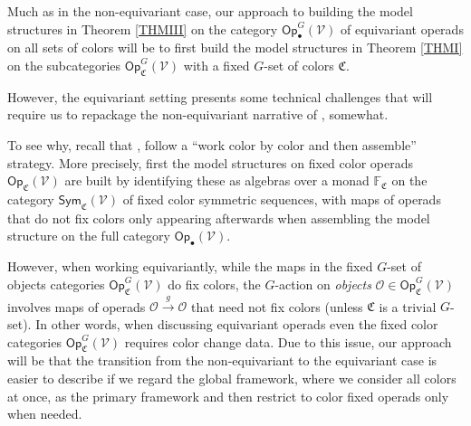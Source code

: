 \documentclass[a4paper,10pt
,draft
]{article}%
\numberwithin{equation}{section}
\numberwithin{figure}{section}
\theoremstyle{definition} %
\newcommand{\V}{\ensuremath{\mathcal V}}
\renewcommand{\O}{\ensuremath{\mathcal O}}
\newcommand{\1}{\ensuremath{\mathbbm 1}}%
\begin{document}
Much as in the non-equivariant case, 
our approach to building the model structures
in Theorem \ref{THMIII} on the category
$\mathsf{Op}^G_{\bullet}(\V)$
of equivariant operads on all sets of colors
will be to first build the model structures in Theorem \ref{THMI}
on the subcategories
$\mathsf{Op}^G_{\mathfrak{C}}(\V)$
with a fixed $G$-set of colors $\mathfrak{C}$.

However, the equivariant setting presents some technical challenges that will require us to repackage the non-equivariant narrative of
\cite{CM13b},\cite{Cav} somewhat.

To see why, recall that \cite{CM13b},\cite{Cav}
follow a ``work color by color and then assemble'' strategy.
More precisely, first the model structures on fixed color operads 
$\mathsf{Op}_{\mathfrak{C}}(\V)$
are built by identifying these as algebras over a monad
$\mathbb{F}_{\mathfrak{C}}$
on the category $\mathsf{Sym}_{\mathfrak{C}}(\V)$
of fixed color symmetric sequences,
with maps of operads that do not fix colors
only appearing afterwards when assembling the model structure on the full category $\mathsf{Op}_{\bullet}(\V)$.

However, when working equivariantly, 
while the maps in the fixed $G$-set of objects categories 
$\mathsf{Op}^G_{\mathfrak{C}}(\V)$ do fix colors, 
the $G$-action on \emph{objects}
$\O \in \mathsf{Op}^G_{\mathfrak{C}}(\V)$
involves maps of operads $\O \xrightarrow{g} \O$
that need not fix colors (unless $\mathfrak{C}$ is a trivial $G$-set).
In other words, when discussing equivariant operads even the fixed color categories 
$\mathsf{Op}^G_{\mathfrak{C}}(\V)$
requires color change data.
Due to this issue, 
our approach will be that the transition from the non-equivariant to the equivariant case is easier to describe 
if we regard the global framework,
where we consider all colors at once, as the primary framework
and then restrict to color fixed operads only when needed.
\end{document}
